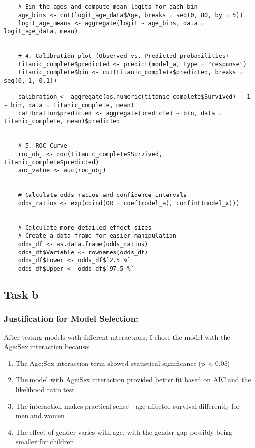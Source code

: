 \documentclass{article}
\begin{document}
\begin{lstlisting}
    # Bin the ages and compute mean logits for each bin
    age_bins <- cut(logit_age_data$Age, breaks = seq(0, 80, by = 5))
    logit_age_means <- aggregate(logit ~ age_bins, data = logit_age_data, mean)
    
    
    # 4. Calibration plot (Observed vs. Predicted probabilities)
    titanic_complete$predicted <- predict(model_a, type = "response")
    titanic_complete$bin <- cut(titanic_complete$predicted, breaks = seq(0, 1, 0.1))
    
    calibration <- aggregate(as.numeric(titanic_complete$Survived) - 1 ~ bin, data = titanic_complete, mean)
    calibration$predicted <- aggregate(predicted ~ bin, data = titanic_complete, mean)$predicted
    
    
    # 5. ROC Curve
    roc_obj <- roc(titanic_complete$Survived, titanic_complete$predicted)
    auc_value <- auc(roc_obj)
    
    
    # Calculate odds ratios and confidence intervals
    odds_ratios <- exp(cbind(OR = coef(model_a), confint(model_a)))
    
    
    # Calculate more detailed effect sizes
    # Create a data frame for easier manipulation
    odds_df <- as.data.frame(odds_ratios)
    odds_df$Variable <- rownames(odds_df)
    odds_df$Lower <- odds_df$`2.5 %`
    odds_df$Upper <- odds_df$`97.5 %`

\end{lstlisting}

\subsection{Task b}

\subsubsection{Justification for Model Selection:}
After testing models with different interactions, I chose the model with the Age:Sex interaction because:
\begin{enumerate}
    \item The Age:Sex interaction term showed statistical significance (p < 0.05)
    \item The model with Age:Sex interaction provided better fit based on AIC and the likelihood ratio test
    \item The interaction makes practical sense - age affected survival differently for men and women
    \item The effect of gender varies with age, with the gender gap possibly being smaller for children
\end{enumerate}
\end{document}
